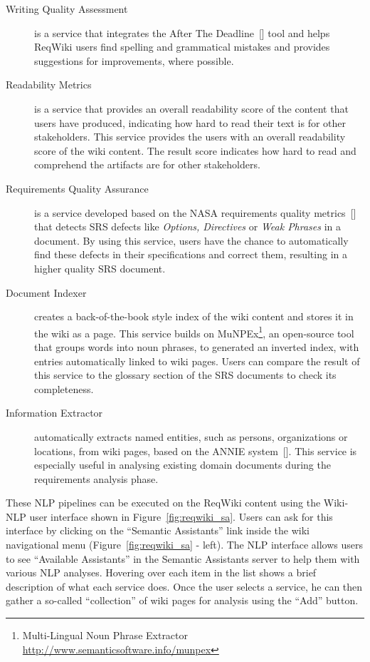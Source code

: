 \documentclass[10pt,twoside,openany,bibtotoc,liststotoc]{scrbook}
\newcommand{\sa}{Semantic Assistants\xspace}
\begin{document}
\begin{description}
\item[Writing Quality Assessment] is a service that integrates the After The Deadline~[\cite{Mudge10}] tool and helps ReqWiki users find spelling and grammatical mistakes and provides suggestions for improvements, where possible.

\item[Readability Metrics] is a service that provides an overall readability score of the content that users have produced, indicating how hard to read their text is for other stakeholders. This service provides the users with an overall readability score of the wiki content. The result score indicates how hard to read and comprehend the artifacts are for other stakeholders.

\item[Requirements Quality Assurance] is a service developed based on the NASA requirements quality metrics~[\cite{Laplante09}] that detects SRS defects like \emph{Options, Directives} or \emph{Weak Phrases} in a document. By using this service, users have the chance to automatically find these defects in their specifications and correct them, resulting in a higher quality SRS document.

\item[Document Indexer] creates a back-of-the-book style index of the wiki content and stores it in the wiki as a page. This service builds on MuNPEx\footnote{Multi-Lingual Noun Phrase Extractor \url{http://www.semanticsoftware.info/munpex}}, an open-source tool that groups words into noun phrases, to generated an inverted index, with entries automatically linked to wiki pages.  Users can compare the result of this service to the glossary section of the SRS documents to check its completeness.

\item[Information Extractor] automatically extracts named entities, such as persons, organizations or locations, from wiki pages, based on the ANNIE system~[\cite{cun11}]. This service is especially useful in analysing existing domain documents during the requirements analysis phase.
\end{description}

These NLP pipelines can be executed on the ReqWiki content using the Wiki-NLP user interface shown in Figure~\ref{fig:reqwiki_sa}. Users can ask for this interface by clicking on the ``\sa'' link inside the wiki navigational menu (Figure~\ref{fig:reqwiki_sa} - left). The NLP interface allows users to see ``Available Assistants'' in the \sa server to help them with various NLP analyses. Hovering over each item in the list shows a brief description of what each service does. Once the user selects a service, he can then gather a so-called ``collection'' of wiki pages for analysis using the ``Add'' button.
\end{document}
